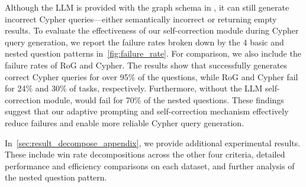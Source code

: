  Although the LLM is provided with the graph schema in \name{}, it can still generate incorrect Cypher queries—either semantically incorrect or returning empty results. To evaluate the effectiveness of our self-correction module during Cypher query generation, we report the failure rates broken down by the 4 basic and nested question patterns in~\autoref{fig:failure_rate}. For comparison, we also include the failure rates of RoG and Cypher. The results show that \name{} successfully generates correct Cypher queries for over 95\% of the questions, while RoG and Cypher fail for 24\% and 30\% of tasks, respectively. Furthermore, without the LLM self-correction module, \name{} would fail for 70\% of the nested questions. These findings suggest that our adaptive prompting and self-correction mechanism effectively reduce failures and enable more reliable Cypher query generation.


 In~\autoref{sec:result_decompose_appendix}, we provide additional experimental results. These include win rate decompositions across the other four criteria, detailed performance and efficiency comparisons on each dataset, and further analysis of the nested question pattern.


